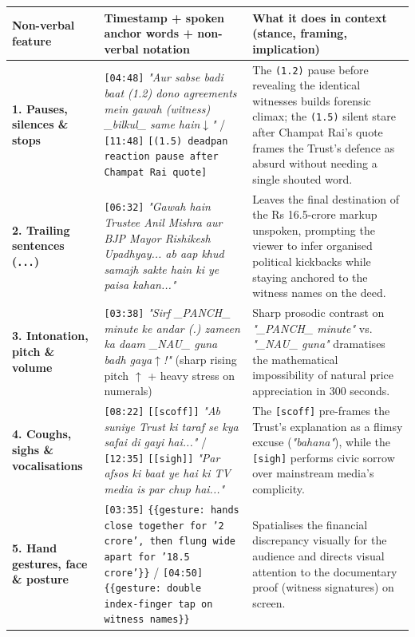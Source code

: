 \documentclass[10pt,a4paper]{article}
\begin{document}
\begin{longtable}{|p{}|p{}|p{}|}
\hline
Non-verbal feature & Timestamp + spoken anchor words + non-verbal notation & What it does in context (stance, framing, implication) \\ \hline \endhead
\textbf{1. Pauses, silences \& stops} & \texttt{[04:48]} \textit{"Aur sabse badi baat (1.2) dono agreements mein gawah (witness) \_bilkul\_ same hain$\downarrow$"} / \texttt{[11:48]} \texttt{[(1.5) deadpan reaction pause after Champat Rai quote]} & The \texttt{(1.2)} pause before revealing the identical witnesses builds forensic climax; the \texttt{(1.5)} silent stare after Champat Rai's quote frames the Trust's defence as absurd without needing a single shouted word. \\ \hline
\textbf{2. Trailing sentences (\texttt{...})} & \texttt{[06:32]} \textit{"Gawah hain Trustee Anil Mishra aur BJP Mayor Rishikesh Upadhyay... ab aap khud samajh sakte hain ki ye paisa kahan..."} & Leaves the final destination of the Rs 16.5-crore markup unspoken, prompting the viewer to infer organised political kickbacks while staying anchored to the witness names on the deed. \\ \hline
\textbf{3. Intonation, pitch \& volume} & \texttt{[03:38]} \textit{"Sirf \_PANCH\_ minute ke andar (.) zameen ka daam \_NAU\_ guna badh gaya$\uparrow$!"} (sharp rising pitch \texttt{$\uparrow$} + heavy stress on numerals) & Sharp prosodic contrast on \textit{"\_PANCH\_ minute"} vs. \textit{"\_NAU\_ guna"} dramatises the mathematical impossibility of natural price appreciation in 300 seconds. \\ \hline
\textbf{4. Coughs, sighs \& vocalisations} & \texttt{[08:22]} \texttt{[[scoff]]} \textit{"Ab suniye Trust ki taraf se kya safai di gayi hai..."} / \texttt{[12:35]} \texttt{[[sigh]]} \textit{"Par afsos ki baat ye hai ki TV media is par chup hai..."} & The \texttt{[scoff]} pre-frames the Trust's explanation as a flimsy excuse (\textit{"bahana"}), while the \texttt{[sigh]} performs civic sorrow over mainstream media's complicity. \\ \hline
\textbf{5. Hand gestures, face \& posture} & \texttt{[03:35]} \texttt{\{\{gesture: hands close together for '2 crore', then flung wide apart for '18.5 crore'\}\}} / \texttt{[04:50]} \texttt{\{\{gesture: double index-finger tap on witness names\}\}} & Spatialises the financial discrepancy visually for the audience and directs visual attention to the documentary proof (witness signatures) on screen. \\ \hline
\end{longtable}
\end{document}
